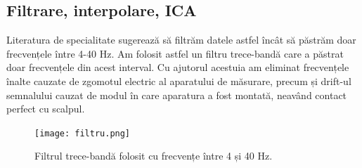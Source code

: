

\subsection{Filtrare, interpolare, ICA}

Literatura de specialitate sugerează să filtrăm datele astfel încât să păstrăm doar frecvențele între 4-40 Hz\cite{intro_to_mne}. Am folosit astfel un filtru trece-bandă care a păstrat doar frecvențele din acest interval. Cu ajutorul acestuia am eliminat frecvențele înalte cauzate de zgomotul electric al aparatului de măsurare, precum și drift-ul semnalului cauzat de modul în care aparatura a fost montată, neavând contact perfect cu scalpul.  %

\setlength{\abovecaptionskip}{0pt}
\setlength{\belowcaptionskip}{0pt}
\begin{figure}[H]
    \centering
		\vspace{-1em}
    \texttt{[image: filtru.png]}
    \caption{Filtrul trece-bandă folosit cu frecvențe între 4 și 40 Hz.}
		\vspace{-1em}
    \label{fig:vizualizare_filtru}
\end{figure}

